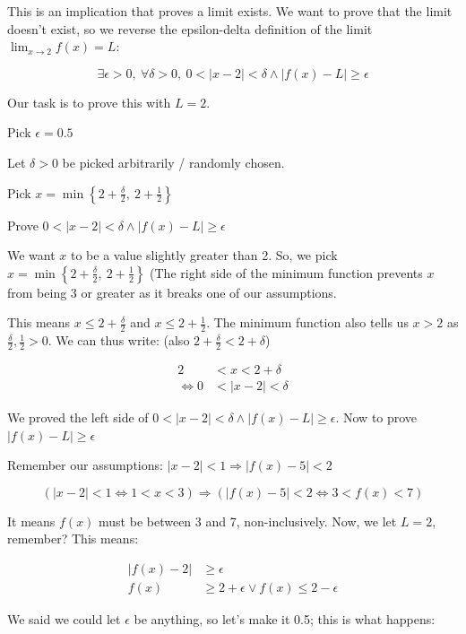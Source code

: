 \documentclass[
]{article}
\begin{document}
This is an implication that proves a limit exists. We want to prove that
the limit doesn't exist, so we reverse the epsilon-delta definition of
the limit $\lim_{x \rightarrow 2}{f(x) = L}$:

$$\exists\epsilon > 0,\ \forall\delta > 0,\ 0 < |x - 2| < \delta \land \left| f(x) - L \right| \geq \epsilon$$

Our task is to prove this with $L = 2$.

Pick $\epsilon = 0.5$

Let $\delta > 0$ be picked arbitrarily / randomly chosen.

Pick $x = \min\left\{ 2 + \frac{\delta}{2},\ 2 + \frac{1}{2} \right\}$

Prove
$0 < |x - 2| < \delta \land \left| f(x) - L \right| \geq \epsilon$

We want $x$ to be a value slightly greater than 2. So, we pick
$x = \min\left\{ 2 + \frac{\delta}{2},\ 2 + \frac{1}{2} \right\}$ (The
right side of the minimum function prevents $x$ from being 3 or
greater as it breaks one of our assumptions.

This means $x \leq 2 + \frac{\delta}{2}$ and
$x \leq 2 + \frac{1}{2}$. The minimum function also tells us $x > 2$
as $\frac{\delta}{2},\frac{1}{2} > 0$. We can thus write: (also
$2 + \frac{\delta}{2} < 2 + \delta$)

\begin{align*}
2 &< x < 2 + \delta
 \\
\Leftrightarrow 0 &< |x - 2| < \delta
\end{align*}


We proved the left side of
$0 < |x - 2| < \delta \land \left| f(x) - L \right| \geq \epsilon$.
Now to prove $\left| f(x) - L \right| \geq \epsilon$

Remember our assumptions:
$|x - 2| < 1 \Rightarrow \left| f(x) - 5 \right| < 2$

$$(|x - 2| < 1 \Leftrightarrow 1 < x < 3) \Rightarrow \left( \left| f(x) - 5 \right| < 2 \Leftrightarrow 3 < f(x) < 7 \right)$$

It means $f(x)$ must be between 3 and 7, non-inclusively. Now, we let
$L = 2$, remember? This means:

\begin{align*}
\left| f(x) - 2 \right| &\geq \epsilon
 \\
f(x) &\geq 2 + \epsilon \vee f(x) \leq 2 - \epsilon
\end{align*}


We said we could let $\epsilon$ be anything, so let's make it 0.5;
this is what happens:
\end{document}
